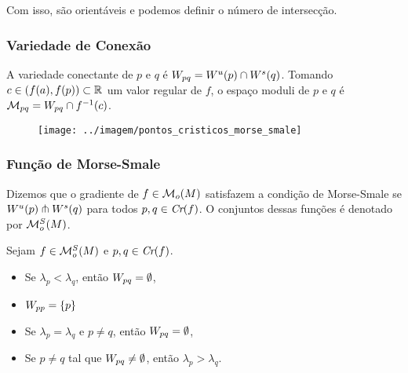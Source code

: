 \documentclass{beamer}
\begin{document}
\begin{footnotesize}
\begin{frame}
		\begin{tiny}
			Com isso, são orientáveis e podemos definir o número de intersecção.
		\end{tiny}
	\end{frame}
	
	\begin{frame}
		\frametitle{Variedade de Conexão}
		\begin{definicao}
			A variedade conectante de $p$ e $q$ é $W_{pq} = W^{u}(p)\cap W^{s}(q)$. Tomando $c \in (f(a), f(p)) \subset \mathbb{R}^{}$ um valor regular de $f$, o espaço moduli de $p$ e $q$ é $\mathcal{M}_{pq} = W_{pq}\cap f^{-1}(c)$.
		\end{definicao}
		
		\begin{figure}
			\centering
			\textbf{}\par
			\texttt{[image: ../imagem/pontos\_cristicos\_morse\_smale]}
		\end{figure}
	\end{frame}
	
	\begin{frame}
		\frametitle{Função de Morse-Smale}
		\begin{definicao}
			Dizemos que o gradiente de $f \in \mathcal{M}_{o}(M)$ satisfazem a condição de Morse-Smale se $W^{u}(p)\pitchfork W^{s}(q)$ para todos $p,q \in \textit{Cr}(f)$. O conjuntos dessas funções é denotado por $\mathcal{M}^{S}_{o}(M)$.
		\end{definicao}
			
		\begin{proposicao}
			Sejam $f \in \mathcal{M}^{S}_{o}(M)$ e $p,q \in \textit{Cr}(f)$.
			\begin{itemize}
				\item Se $\lambda_{p}<\lambda_{q}$, então $W_{pq} = \emptyset$,
				
				\item $W_{pp} = \{p\}$
				
				\item Se $\lambda_{p} = \lambda_{q}$ e $p\neq q$, então $W_{pq} = \emptyset$,
				
				\item Se $p \neq q$ tal que $W_{pq} \neq \emptyset$, então $\lambda_{p}>\lambda_{q}$.
			\end{itemize}
		\end{proposicao}
		

\end{frame}
\end{footnotesize}
\end{document}
